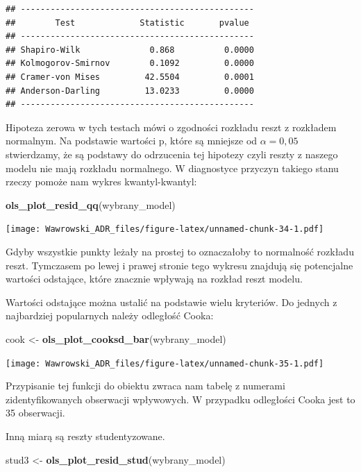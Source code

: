 \documentclass[]{book}
\newenvironment{Shaded}{\begin{snugshade}}{\end{snugshade}}
\newcommand{\KeywordTok}[1]{\textcolor[rgb]{0.13,0.29,0.53}{\textbf{#1}}}
\newcommand{\NormalTok}[1]{#1}
\newcommand{\StringTok}[1]{\textcolor[rgb]{0.31,0.60,0.02}{#1}}
\begin{document}
\begin{verbatim}
## -----------------------------------------------
##        Test             Statistic       pvalue  
## -----------------------------------------------
## Shapiro-Wilk              0.868          0.0000 
## Kolmogorov-Smirnov        0.1092         0.0000 
## Cramer-von Mises         42.5504         0.0001 
## Anderson-Darling         13.0233         0.0000 
## -----------------------------------------------
\end{verbatim}

Hipoteza zerowa w tych testach mówi o zgodności rozkładu reszt z rozkładem normalnym. Na podstawie wartości p, które są mniejsze od \(\alpha=0,05\) stwierdzamy, że są podstawy do odrzucenia tej hipotezy czyli reszty z naszego modelu nie mają rozkładu normalnego. W diagnostyce przyczyn takiego stanu rzeczy pomoże nam wykres kwantyl-kwantyl:

\begin{Shaded}
\begin{Highlighting}[]
\KeywordTok{ols_plot_resid_qq}\NormalTok{(wybrany_model)}
\end{Highlighting}
\end{Shaded}

\texttt{[image: Wawrowski\_ADR\_files/figure-latex/unnamed-chunk-34-1.pdf]}

Gdyby wszystkie punkty leżały na prostej to oznaczałoby to normalność rozkładu reszt. Tymczasem po lewej i prawej stronie tego wykresu znajdują się potencjalne wartości odstające, które znacznie wpływają na rozkład reszt modelu.

Wartości odstające można ustalić na podstawie wielu kryteriów. Do jednych z najbardziej popularnych należy odległość Cooka:

\begin{Shaded}
\begin{Highlighting}[]
\NormalTok{cook <-}\StringTok{ }\KeywordTok{ols_plot_cooksd_bar}\NormalTok{(wybrany_model)}
\end{Highlighting}
\end{Shaded}

\texttt{[image: Wawrowski\_ADR\_files/figure-latex/unnamed-chunk-35-1.pdf]}

Przypisanie tej funkcji do obiektu zwraca nam tabelę z numerami zidentyfikowanych obserwacji wpływowych. W przypadku odległości Cooka jest to 35 obserwacji.

Inną miarą są reszty studentyzowane.

\begin{Shaded}
\begin{Highlighting}[]
\NormalTok{stud3 <-}\StringTok{ }\KeywordTok{ols_plot_resid_stud}\NormalTok{(wybrany_model)}
\end{Highlighting}
\end{Shaded}
\end{document}
